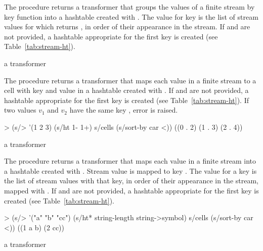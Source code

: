 The  procedure returns a transformer that groups the values of a finite
stream by key function  into a hashtable created with . The value for key  is the list of stream values for
which  returns , in order of their appearance in the stream. If
 and  are not provided, a hashtable appropriate for the first key is
created (see Table~\ref{tab:stream-ht}).

\begin{procedure}
\end{procedure}
\returns{} a transformer

The  procedure returns a transformer that maps each value  in a finite
stream to a cell with key  and value  in a hashtable created
with . If  and  are
not provided, a hashtable appropriate for the first key is created (see
Table~\ref{tab:stream-ht}).  If two values $v_1$ and $v_2$ have the same key ,
error  is raised.

\codebegin
> (s/> '(1 2 3)
    (s/ht 1- 1+)
    s/cells
    (s/sort-by car <))
((0 . 2) (1 . 3) (2 . 4))
\codeend

\begin{procedure}
\end{procedure}
\returns{} a transformer

The  procedure returns a transformer that maps each value in a finite stream
into a hashtable created with . Stream
value  is mapped to key . The value for a key is the list of stream
values with that key, in order of their appearance in the stream, mapped with . If
 and  are not provided, a hashtable appropriate for the first key is
created (see Table~\ref{tab:stream-ht}).

\codebegin
> (s/> '("a" "b" "cc")
    (s/ht* string-length string->symbol)
    s/cells
    (s/sort-by car <))
((1 a b) (2 cc))
\codeend

\begin{procedure}
\end{procedure}
\returns{} a transformer

